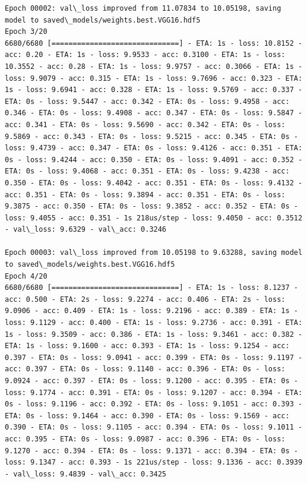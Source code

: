 \documentclass[11pt]{article}
\begin{document}
\begin{Verbatim}[commandchars=\\\{\}]
Epoch 00002: val\_loss improved from 11.07834 to 10.05198, saving model to saved\_models/weights.best.VGG16.hdf5
Epoch 3/20
6680/6680 [==============================] - ETA: 1s - loss: 10.8152 - acc: 0.20 - ETA: 1s - loss: 9.9533 - acc: 0.3100 - ETA: 1s - loss: 10.3552 - acc: 0.28 - ETA: 1s - loss: 9.9757 - acc: 0.3066 - ETA: 1s - loss: 9.9079 - acc: 0.315 - ETA: 1s - loss: 9.7696 - acc: 0.323 - ETA: 1s - loss: 9.6941 - acc: 0.328 - ETA: 1s - loss: 9.5769 - acc: 0.337 - ETA: 0s - loss: 9.5447 - acc: 0.342 - ETA: 0s - loss: 9.4958 - acc: 0.346 - ETA: 0s - loss: 9.4908 - acc: 0.347 - ETA: 0s - loss: 9.5847 - acc: 0.341 - ETA: 0s - loss: 9.5690 - acc: 0.342 - ETA: 0s - loss: 9.5869 - acc: 0.343 - ETA: 0s - loss: 9.5215 - acc: 0.345 - ETA: 0s - loss: 9.4739 - acc: 0.347 - ETA: 0s - loss: 9.4126 - acc: 0.351 - ETA: 0s - loss: 9.4244 - acc: 0.350 - ETA: 0s - loss: 9.4091 - acc: 0.352 - ETA: 0s - loss: 9.4068 - acc: 0.351 - ETA: 0s - loss: 9.4238 - acc: 0.350 - ETA: 0s - loss: 9.4042 - acc: 0.351 - ETA: 0s - loss: 9.4132 - acc: 0.351 - ETA: 0s - loss: 9.3894 - acc: 0.351 - ETA: 0s - loss: 9.3875 - acc: 0.350 - ETA: 0s - loss: 9.3852 - acc: 0.352 - ETA: 0s - loss: 9.4055 - acc: 0.351 - 1s 218us/step - loss: 9.4050 - acc: 0.3512 - val\_loss: 9.6329 - val\_acc: 0.3246

Epoch 00003: val\_loss improved from 10.05198 to 9.63288, saving model to saved\_models/weights.best.VGG16.hdf5
Epoch 4/20
6680/6680 [==============================] - ETA: 1s - loss: 8.1237 - acc: 0.500 - ETA: 2s - loss: 9.2274 - acc: 0.406 - ETA: 2s - loss: 9.0906 - acc: 0.409 - ETA: 1s - loss: 9.2196 - acc: 0.389 - ETA: 1s - loss: 9.1129 - acc: 0.400 - ETA: 1s - loss: 9.2736 - acc: 0.391 - ETA: 1s - loss: 9.3509 - acc: 0.386 - ETA: 1s - loss: 9.3461 - acc: 0.382 - ETA: 1s - loss: 9.1600 - acc: 0.393 - ETA: 1s - loss: 9.1254 - acc: 0.397 - ETA: 0s - loss: 9.0941 - acc: 0.399 - ETA: 0s - loss: 9.1197 - acc: 0.397 - ETA: 0s - loss: 9.1140 - acc: 0.396 - ETA: 0s - loss: 9.0924 - acc: 0.397 - ETA: 0s - loss: 9.1200 - acc: 0.395 - ETA: 0s - loss: 9.1774 - acc: 0.391 - ETA: 0s - loss: 9.1207 - acc: 0.394 - ETA: 0s - loss: 9.1196 - acc: 0.392 - ETA: 0s - loss: 9.1051 - acc: 0.393 - ETA: 0s - loss: 9.1464 - acc: 0.390 - ETA: 0s - loss: 9.1569 - acc: 0.390 - ETA: 0s - loss: 9.1105 - acc: 0.394 - ETA: 0s - loss: 9.1011 - acc: 0.395 - ETA: 0s - loss: 9.0987 - acc: 0.396 - ETA: 0s - loss: 9.1270 - acc: 0.394 - ETA: 0s - loss: 9.1371 - acc: 0.394 - ETA: 0s - loss: 9.1347 - acc: 0.393 - 1s 221us/step - loss: 9.1336 - acc: 0.3939 - val\_loss: 9.4839 - val\_acc: 0.3425


\end{Verbatim}
\end{document}
